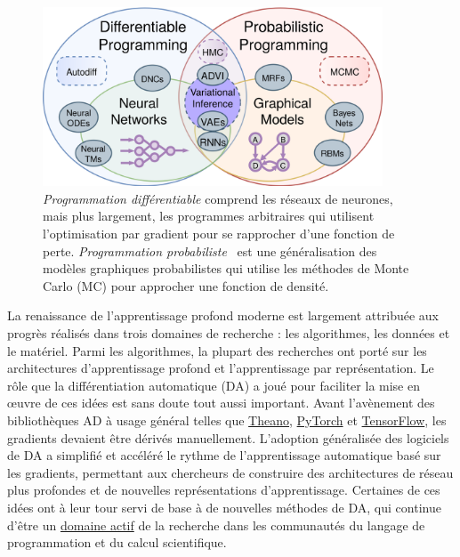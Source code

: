 \begin{figure}
    \centering
    \includegraphics[width=0.90\textwidth]{../figures/diff_prob_prog.png}
    \caption{\textit{Programmation différentiable} comprend les réseaux de neurones, mais plus largement, les programmes arbitraires qui utilisent l'optimisation par gradient pour se rapprocher d'une fonction de perte. \textit{Programmation probabiliste}~\citep{tristan2014augur, carpenter2017stan, gorinova2018slicstan} est une généralisation des modèles graphiques probabilistes qui utilise les méthodes de Monte Carlo (MC) pour approcher une fonction de densité.}
    \label{fig:diff_prob_prog}
\end{figure}

La renaissance de l'apprentissage profond moderne est largement attribuée aux progrès réalisés dans trois domaines de recherche : les algorithmes, les données et le matériel. Parmi les algorithmes, la plupart des recherches ont porté sur les architectures d'apprentissage profond et l'apprentissage par représentation. Le rôle que la différentiation automatique (DA) a joué pour faciliter la mise en œuvre de ces idées est sans doute tout aussi important. Avant l'avènement des bibliothèques AD à usage général telles que \href{http://deeplearning.net/software/theano/}{Theano}, \href{https://pytorch.org/}{PyTorch} et \href{https://tensorflow.org/}{TensorFlow}, les gradients devaient être dérivés manuellement. L'adoption généralisée des logiciels de DA a simplifié et accéléré le rythme de l'apprentissage automatique basé sur les gradients, permettant aux chercheurs de construire des architectures de réseau plus profondes et de nouvelles représentations d'apprentissage. Certaines de ces idées ont à leur tour servi de base à de nouvelles méthodes de DA, qui continue d'être un \href{http://www.autodiff.org}{domaine actif} de la recherche dans les communautés du langage de programmation et du calcul scientifique.

